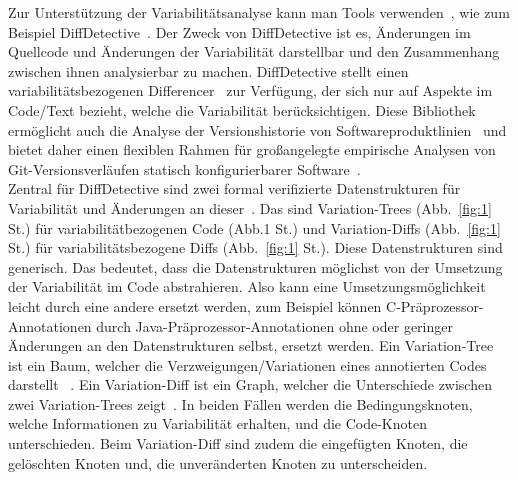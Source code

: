 Zur Unterstützung der Variabilitätsanalyse kann man Tools verwenden~\cite{SSK+:VaMoS20,10.1145/2660190.2662113}, wie zum Beispiel DiffDetective~\cite{BSM+:FSE24}. Der Zweck von DiffDetective ist es, Änderungen im Quellcode und Änderungen der Variabilität darstellbar und den Zusammenhang zwischen ihnen analysierbar zu machen. DiffDetective stellt einen variabilitätsbezogenen Differencer~\cite{BSM+:FSE24,BTS+:ESECFSE22} zur Verfügung, der sich nur auf Aspekte im Code/Text bezieht, welche die Variabilität berücksichtigen. Diese Bibliothek ermöglicht auch die Analyse der Versionshistorie von Softwareproduktlinien~\cite{BTS+:ESECFSE22} und bietet daher einen flexiblen Rahmen für großangelegte empirische Analysen von Git-Versionsverläufen statisch konfigurierbarer Software~\cite{BSM+:FSE24,BSG+:SPLC23}.\\

Zentral für DiffDetective sind zwei formal verifizierte Datenstrukturen für Variabilität und Änderungen an dieser~\cite{BTS+:ESECFSE22}. Das sind Variation-Trees (Abb.~\ref{fig:1} St.) für variabilitätbezogenen Code (Abb.1 St.) und Variation-Diffs (Abb.~\ref{fig:1} St.) für variabilitätsbezogene Diffs (Abb.~\ref{fig:1} St.). Diese Datenstrukturen sind generisch. Das bedeutet, dass die Datenstrukturen möglichst von der Umsetzung der Variabilität im Code abstrahieren. Also kann eine Umsetzungsmöglichkeit leicht durch eine andere ersetzt werden, zum Beispiel können C-Präprozessor-Annotationen  durch Java-Präprozessor-Annotationen ohne oder geringer Änderungen an den Datenstrukturen selbst, ersetzt werden. Ein Variation-Tree ist ein Baum, welcher die Verzweigungen/Variationen eines annotierten Codes darstellt ~\cite{BSM+:FSE24,BTS+:ESECFSE22,BSG+:SPLC23}. Ein Variation-Diff ist ein Graph, welcher die Unterschiede zwischen zwei Variation-Trees zeigt~\cite{BSM+:FSE24,BTS+:ESECFSE22,BSG+:SPLC23}. In beiden Fällen werden die Bedingungsknoten, welche Informationen zu Variabilität erhalten, und die Code-Knoten unterschieden. Beim Variation-Diff sind zudem die eingefügten Knoten, die gelöschten Knoten und, die unveränderten Knoten zu unterscheiden.\\



